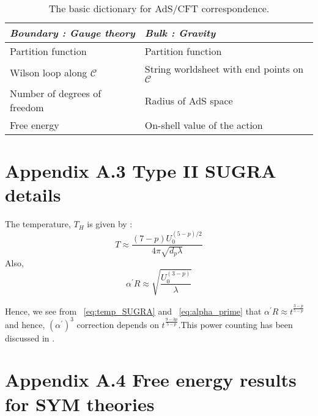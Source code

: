 \begin {table}[htbp] 
\begin{center}
\begin{tabular}{ |  p{8cm} |  p{8cm} |}
    \hline
    \emph{Boundary : Gauge theory}  & \emph{Bulk : Gravity }   \\ \hline \hline 
    Partition function   &  Partition function \\ \hline 
     Wilson loop along $\mathcal{C}$ & String worldsheet with end points on $\mathcal{C}$  \\ \hline 
     Number of degrees of freedom & Radius of AdS space  \\ \hline
     Free energy & On-shell value of the action  \\ \hline
\end{tabular}
\vspace{3mm}
\caption {The basic dictionary for AdS/CFT correspondence. } 
\end{center}
\end {table}


\noindent \section*{\label{app:spinors} Appendix A.3 Type II SUGRA details}

The temperature, $T_{H}$ is given by : 
\begin{equation}
\label{eq:temp_SUGRA}
T \approx \frac{(7-p) U_{0}^{(5-p)/2}}{4 \pi \sqrt{d_{p} \lambda}}
\end{equation}
Also, 
\begin{equation}
  \label{eq:alpha_prime}
\alpha^{\prime} R \approx \sqrt{\frac{U_{0}^{(3-p)}}{\lambda}}
\end{equation}

Hence, we see from ~\ref{eq:temp_SUGRA} and ~\ref{eq:alpha_prime} that $ \alpha^{\prime} R \approx t^{\frac{3-p}{5-p}}$ and hence, $ (\alpha^{\prime})^3$ correction depends on $t^{\frac{9-3p}{5-p}}$.This power counting has been discussed in \cite{Berkowitz:2016jlq}.




\section*{\label{app:energy1} Appendix A.4 Free energy results for SYM theories}



